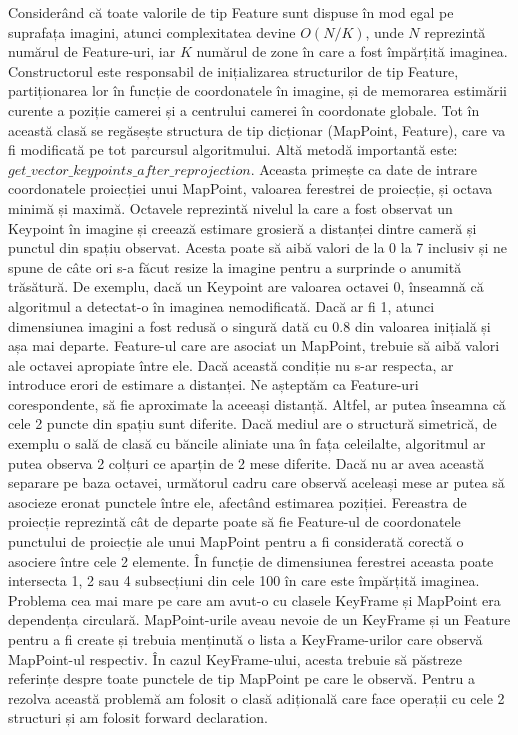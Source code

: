 \documentclass[12pt,a4paper]{report}
\begin{document}
Considerând că toate valorile de tip Feature sunt dispuse în mod egal pe suprafața imagini, atunci
complexitatea devine $ O(N / K) $, unde \(N\) reprezintă numărul de Feature-uri, iar \(K\) 
numărul de zone în care a fost împărțită imaginea. Constructorul este responsabil de inițializarea
structurilor de tip Feature, partiționarea lor în funcție de coordonatele în imagine, și de memorarea
estimării curente a poziție camerei și a centrului camerei în coordonate globale. Tot în această 
clasă se regăsește structura de tip dicționar (MapPoint, Feature), care va fi modificată pe tot 
parcursul algoritmului. Altă metodă importantă este: $ get\_vector\_keypoints\_after\_reprojection $.
Aceasta primește ca date de intrare coordonatele proiecției unui MapPoint, valoarea ferestrei 
de proiecție, și octava minimă și maximă. Octavele reprezintă nivelul la care a fost observat 
un Keypoint în imagine și creează estimare grosieră a distanței dintre cameră și punctul din spațiu 
observat. Acesta poate să aibă valori de la 0 la 7 inclusiv și ne spune de câte ori 
s-a făcut resize la imagine pentru a surprinde o anumită trăsătură. De exemplu, dacă 
un Keypoint are valoarea octavei 0, înseamnă că algoritmul a detectat-o în imaginea nemodificată.
Dacă ar fi 1, atunci dimensiunea imagini a fost redusă o singură dată cu 0.8 din valoarea inițială 
și așa mai departe. Feature-ul care are asociat un MapPoint, trebuie să aibă valori ale octavei
apropiate între ele. Dacă această condiție nu s-ar respecta, ar introduce erori de estimare 
a distanței. Ne așteptăm ca Feature-uri corespondente, să fie aproximate la aceeași distanță.
Altfel, ar putea înseamna că cele 2 puncte din spațiu sunt diferite. Dacă mediul are o structură 
simetrică, de exemplu o sală de clasă cu băncile aliniate una în fața celeilalte, algoritmul 
ar putea observa 2 colțuri ce aparțin de 2 mese diferite. Dacă nu ar avea această separare 
pe baza octavei, următorul cadru care observă aceleași mese ar putea să asocieze eronat punctele 
între ele, afectând estimarea poziției. Fereastra de proiecție reprezintă cât de departe poate 
să fie Feature-ul de coordonatele punctului de proiecție ale unui MapPoint pentru a fi considerată
corectă o asociere între cele 2 elemente. În funcție de dimensiunea ferestrei aceasta poate intersecta 1, 2 sau 4 subsecțiuni din cele 100 în care 
este împărțită imaginea. Problema cea mai mare pe care am avut-o cu clasele KeyFrame și MapPoint
era dependența circulară. MapPoint-urile aveau nevoie de un KeyFrame și un Feature pentru a fi 
create și trebuia menținută o lista a KeyFrame-urilor care observă MapPoint-ul respectiv.
În cazul KeyFrame-ului, acesta trebuie să păstreze referințe despre toate punctele de tip MapPoint pe 
care le observă. Pentru a rezolva această problemă am folosit o clasă adițională care face 
operații cu cele 2 structuri și am folosit forward declaration.  \\  
\end{document}
